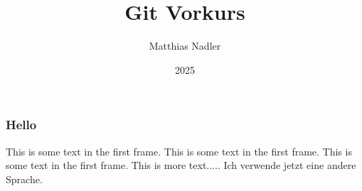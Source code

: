\documentclass{beamer}
\title{Git Vorkurs}
\author{Matthias Nadler}
\institute{Uni Basel}
\date{2025}
\begin{document}
\frame{\titlepage}

\begin{frame}
\frametitle{Hello}
This is some text in the first frame. This is some text in the first frame. This is some text in the first frame.
This is more text.....
Ich verwende jetzt eine andere Sprache. 
\end{frame}
\end{document}
